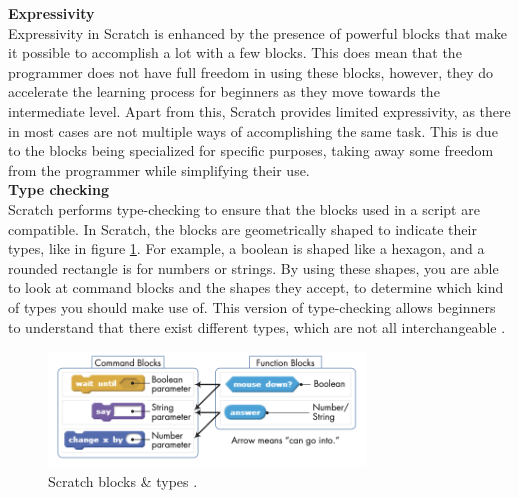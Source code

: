 
\noindent\textbf{Expressivity}\\
\noindent Expressivity in Scratch is enhanced by the presence of powerful blocks that make it possible to accomplish a lot with a few blocks. This does mean that the programmer does not have full freedom in using these blocks, however, they do accelerate the learning process for beginners as they move towards the intermediate level. Apart from this, Scratch provides limited expressivity, as there in most cases are not multiple ways of accomplishing the same task. This is due to the blocks being specialized for specific purposes, taking away some freedom from the programmer while simplifying their use.\\

\noindent\textbf{Type checking}\\
\noindent 
Scratch performs type-checking to ensure that the blocks used in a script are compatible. In Scratch, the blocks are geometrically shaped to indicate their types, like in figure \ref{fig:scratchblocks}. For example, a boolean is shaped like a hexagon, and a rounded rectangle is for numbers or strings. By using these shapes, you are able to look at command blocks and the shapes they accept, to determine which kind of types you should make use of. This version of type-checking allows beginners to understand that there exist different types, which are not all interchangeable \cite{Scratchblocks}.

\begin{figure}[H]
    \begin{center}
        \includegraphics[width=0.75\textwidth]{Files/Billeder: Analyse/Scratchblocks.png}
    \end{center}
    \caption{Scratch blocks \& types \cite{Scratchblocks}.}
    \label{fig:scratchblocks}
\end{figure}

